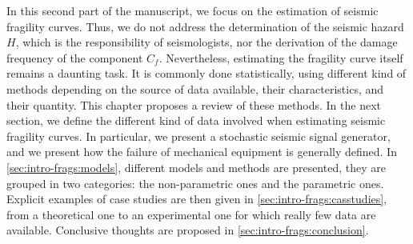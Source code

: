 In this second part of the manuscript, we focus on the estimation of seismic fragility curves. 
Thus, we do not address the determination of the seismic hazard $H$, which is the responsibility of seismologists, 
nor the derivation of the damage frequency of the component $C_f$.
Nevertheless, estimating the fragility curve itself %
remains a daunting task. It is commonly done statistically, using different kind of methods depending 
on the source of data available, their characteristics, and their quantity.
This chapter proposes a review of these methods. 
In the next section,
we define the different kind of data involved when estimating seismic fragility curves. In particular, we present a stochastic seismic signal generator, and  we present how the failure of mechanical equipment is generally defined.
In \cref{sec:intro-frags:models}, different models and methods are presented, they are grouped in two categories: the non-parametric ones and the parametric ones.
Explicit examples of case studies are then given in \cref{sec:intro-frags:casstudies}, from a theoretical one to an experimental one for which really few data are available.
Conclusive thoughts are proposed in \cref{sec:intro-frags:conclusion}.











%
%










